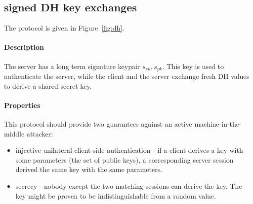 \documentclass{article}
\newcommand{\sfsk}{\mathit{sk}}
\newcommand{\sfpk}{\mathit{pk}}
\begin{document}
\subsection{signed DH key exchanges}

The protocol is given in Figure~\ref{fig:dh}.

 \paragraph{Description} The server has a long term signature keypair $s_\sfsk,s_\sfpk$.
This key is used to authenticate the server, while the client and the server exchange fresh DH values to derive a shared secret key.

\paragraph{Properties} This protocol should provide two guarantees against an active machine-in-the-middle attacker:
\begin{itemize}
\item injective unilateral client-side authentication - if a client derives a key with some parameters (the set of public keys), a corresponding server session derived the same key with the same parameters.
\item secrecy - nobody except the two matching sessions can derive the key.  The key might be proven to be indistinguishable from a random value.
\end{itemize}
\end{document}
